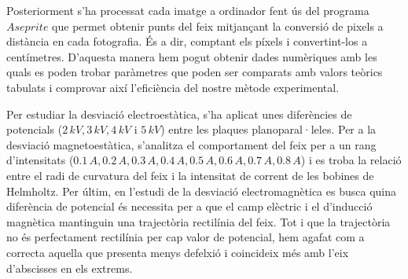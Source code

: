 \documentclass[11pt]{article}
\numberwithin{equation}{section}
\numberwithin{figure}{section}
\numberwithin{table}{section}
\begin{document}
Posteriorment s'ha processat cada imatge a ordinador fent ús del programa $Aseprite$ que permet obtenir punts del feix mitjançant la conversió de pixels a distància en cada fotografia. És a dir, comptant els píxels i convertint-los a centímetres. D'aquesta manera hem pogut obtenir dades numèriques amb les quals es poden trobar paràmetres que poden ser comparats amb valors teòrics tabulats i comprovar així l'eficiència del nostre mètode experimental.

Per estudiar la desviació electroestàtica, s'ha aplicat unes diferències de potencials ($2\,kV, 3\,kV, 4\,kV$ i $5\,kV$) entre les plaques planoparal·leles. Per a la desviació magnetoestàtica, s'analitza el comportament del feix per a un rang d'intensitats ($0.1\,A, 0.2\,A, 0.3\,A, 0.4\,A, 0.5\,A, 0.6\,A, 0.7\,A, 0.8\,A$) i es troba la relació entre el radi de curvatura del feix i la intensitat de corrent de les bobines de Helmholtz. Per últim, en l'estudi de la desviació electromagnètica es busca quina diferència de potencial és necessita per a que el camp elèctric i el d'inducció magnètica mantinguin una trajectòria rectilínia del feix. Tot i que la trajectòria no és perfectament rectilínia per cap valor de potencial, hem agafat com a correcta aquella que presenta menys defelxió i coincideix més amb l'eix d'abscisses en els extrems.



\end{document}
